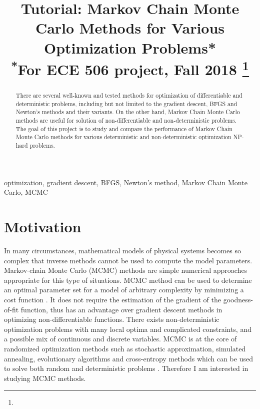 \documentclass[conference]{IEEEtran}
\begin{document}
\title{Tutorial: Markov Chain Monte Carlo Methods for Various Optimization Problems*\\
{\footnotesize \textsuperscript{*}For ECE 506 project, Fall 2018}
\thanks{}
}

\author{
}

\maketitle

\begin{abstract}
There are several well-known and tested methods for optimization of differentiable and deterministic problems, including but not limited to the gradient descent, BFGS and Newton's methods and their variants. On the other hand, Markov Chain Monte Carlo methods are useful for solution of non-differentiable and non-deterministic problems. The goal of this project is to study and compare the performance of Markov Chain Monte Carlo methods for various deterministic and non-deterministic optimization NP-hard problems.
\end{abstract}

\begin{IEEEkeywords}
optimization, gradient descent, BFGS, Newton's method, Markov Chain Monte Carlo, MCMC
\end{IEEEkeywords}

\section{Motivation}
In many circumstances, mathematical models of physical systems becomes so complex that inverse methods cannot be used to compute the model parameters. Markov-chain Monte Carlo (MCMC) methods are simple numerical approaches appropriate for this type of situations. MCMC method can be used to determine an optimal parameter set for a model of arbitrary complexity by minimizing a cost function \cite{b6}. It does not require the estimation of the gradient of the goodness-of-fit function, thus has an advantage over gradient descent methods \cite{b7} in optimizing non-differentiable functions. There exists non-deterministic optimization problems with many local optima and complicated constraints, and a possible mix of continuous and discrete variables. MCMC is at the core of randomized optimization methods such as stochastic approximation, simulated annealing, evolutionary algorithms and cross-entropy methods which can be used to solve both random and deterministic problems \cite{b8}. Therefore I am interested in studying MCMC methods.
\end{document}
